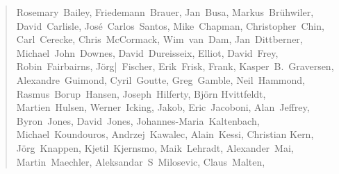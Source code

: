 \begin{quote}
\flushleft\small
Rosemary~Bailey,        %
Friedemann~Brauer,      %
Jan~Busa,               %
Markus~Br\"uhwiler,     %
David~Carlisle,         %
Jos\'e~Carlos~Santos,   %
Mike~Chapman,           %
Christopher~Chin,       %
Carl~Cerecke,           %
Chris~McCormack,        %
Wim~van~Dam,            %
Jan~Dittberner,         %
Michael~John~Downes,    %
David~Dureisseix,       %
Elliot,                 %
David~Frey,             %
Robin~Fairbairns,       %
J\"org|~Fischer,        %
Erik~Frisk,             %
Frank,                  %
Kasper~B.~Graversen,    %
Alexandre~Guimond,      %
Cyril~Goutte,           %
Greg~Gamble,            %
Neil~Hammond,           %
Rasmus~Borup~Hansen,    %
Joseph~Hilferty,        %
Bj\"orn Hvittfeldt,     %
Martien~Hulsen,         %
Werner~Icking,          %
Jakob,                  %
Eric~Jacoboni,          %
Alan~Jeffrey,           %
Byron~Jones,            %
David~Jones,            %
Johannes-Maria~Kaltenbach, %
Michael~Koundouros,     %
Andrzej~Kawalec,        %
Alain~Kessi,            %
Christian Kern,         %
J\"org~Knappen,         %
Kjetil~Kjernsmo,        %
Maik~Lehradt,           %
Alexander~Mai,          %
Martin~Maechler,        %
Aleksandar~S~Milosevic, %
Claus~Malten,           %

\end{quote}
